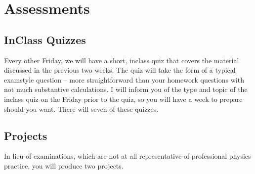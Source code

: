 \documentclass[letterpaper,10pt,english]{jupyterBook}
\begin{document}
\sphinxstepscope


\section{Assessments}
\label{\detokenize{content/0_course/assessments:assessments}}\label{\detokenize{content/0_course/assessments::doc}}

\subsection{In\sphinxhyphen{}Class Quizzes}
\label{\detokenize{content/0_course/assessments:in-class-quizzes}}
\sphinxAtStartPar
Every other Friday, we will have a short, in\sphinxhyphen{}class quiz that covers the material discussed in the previous two weeks. The quiz will take the form of a typical exam\sphinxhyphen{}style question – more straight\sphinxhyphen{}forward than your homework questions with not much substantive calculations. I will inform you of the type and topic of the in\sphinxhyphen{}class quiz on the Friday prior to the quiz, so you will have a week to prepare should you want. There will seven of these quizzes. 


\subsection{Projects}
\label{\detokenize{content/0_course/assessments:projects}}
\sphinxAtStartPar
In lieu of examinations, which are not at all representative of professional physics practice, you will produce two projects.
\end{document}
